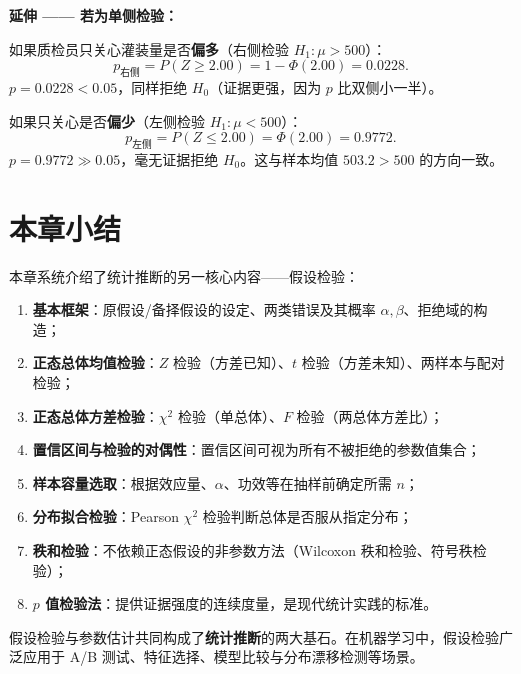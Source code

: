 \begin{example}[$p$ 值检验法完整演示]
\medskip
\textbf{延伸 —— 若为单侧检验：}

如果质检员只关心灌装量是否\textbf{偏多}（右侧检验 $H_1: \mu > 500$）：
\begin{equation}
    p_{\text{右侧}} = P(Z \ge 2.00) = 1 - \Phi(2.00) = 0.0228.
\end{equation}
$p = 0.0228 < 0.05$，同样拒绝 $H_0$（证据更强，因为 $p$ 比双侧小一半）。

如果只关心是否\textbf{偏少}（左侧检验 $H_1: \mu < 500$）：
\begin{equation}
    p_{\text{左侧}} = P(Z \le 2.00) = \Phi(2.00) = 0.9772.
\end{equation}
$p = 0.9772 \gg 0.05$，毫无证据拒绝 $H_0$。这与样本均值 $503.2 > 500$ 的方向一致。
\end{example}

\section*{本章小结}

本章系统介绍了统计推断的另一核心内容——假设检验：

\begin{enumerate}
    \item \textbf{基本框架}：原假设/备择假设的设定、两类错误及其概率 $\alpha, \beta$、拒绝域的构造；
    \item \textbf{正态总体均值检验}：$Z$ 检验（方差已知）、$t$ 检验（方差未知）、两样本与配对检验；
    \item \textbf{正态总体方差检验}：$\chi^2$ 检验（单总体）、$F$ 检验（两总体方差比）；
    \item \textbf{置信区间与检验的对偶性}：置信区间可视为所有不被拒绝的参数值集合；
    \item \textbf{样本容量选取}：根据效应量、$\alpha$、功效等在抽样前确定所需 $n$；
    \item \textbf{分布拟合检验}：Pearson $\chi^2$ 检验判断总体是否服从指定分布；
    \item \textbf{秩和检验}：不依赖正态假设的非参数方法（Wilcoxon 秩和检验、符号秩检验）；
    \item \textbf{$p$ 值检验法}：提供证据强度的连续度量，是现代统计实践的标准。
\end{enumerate}

假设检验与参数估计共同构成了\textbf{统计推断}的两大基石。在机器学习中，假设检验广泛应用于 A/B 测试、特征选择、模型比较与分布漂移检测等场景。


